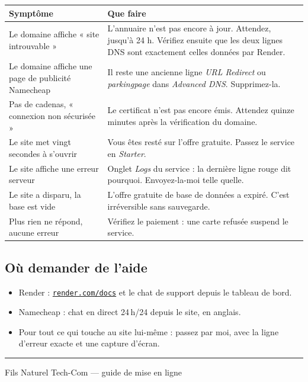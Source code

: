 \documentclass[11pt,a4paper]{article}
\newcommand{\champ}[1]{\textit{#1}}
\newcommand{\lien}[2]{\href{#1}{\texttt{#2}}}
\begin{document}
\begin{center}
\begin{tabularx}{\textwidth}{@{}lX@{}}
\toprule
\textbf{Symptôme} & \textbf{Que faire} \\
\midrule
Le domaine affiche « site introuvable » & L'annuaire n'est pas encore à jour. Attendez, jusqu'à 24 h. Vérifiez ensuite que les deux lignes DNS sont exactement celles données par Render. \\
Le domaine affiche une page de publicité Namecheap & Il reste une ancienne ligne \champ{URL Redirect} ou \champ{parkingpage} dans \champ{Advanced DNS}. Supprimez-la. \\
Pas de cadenas, « connexion non sécurisée » & Le certificat n'est pas encore émis. Attendez quinze minutes après la vérification du domaine. \\
Le site met vingt secondes à s'ouvrir & Vous êtes resté sur l'offre gratuite. Passez le service en \champ{Starter}. \\
Le site affiche une erreur serveur & Onglet \champ{Logs} du service : la dernière ligne rouge dit pourquoi. Envoyez-la-moi telle quelle. \\
Le site a disparu, la base est vide & L'offre gratuite de base de données a expiré. C'est irréversible sans sauvegarde. \\
Plus rien ne répond, aucune erreur & Vérifiez le paiement : une carte refusée suspend le service. \\
\bottomrule
\end{tabularx}
\end{center}

\subsection{Où demander de l'aide}

\begin{itemize}
  \item Render : \lien{https://render.com/docs}{render.com/docs} et le chat de support depuis le tableau de bord.
  \item Namecheap : chat en direct 24\,h/24 depuis le site, en anglais.
  \item Pour tout ce qui touche au site lui-même : passez par moi, avec la
        ligne d'erreur exacte et une capture d'écran.
\end{itemize}

\vspace{1.2cm}
\begin{center}
{\color{sig}\rule{3cm}{1.5pt}}\par
\vspace{0.4cm}
{\color{encre2}\small Fils Naturel Tech-Com — guide de mise en ligne}
\end{center}
\end{document}
